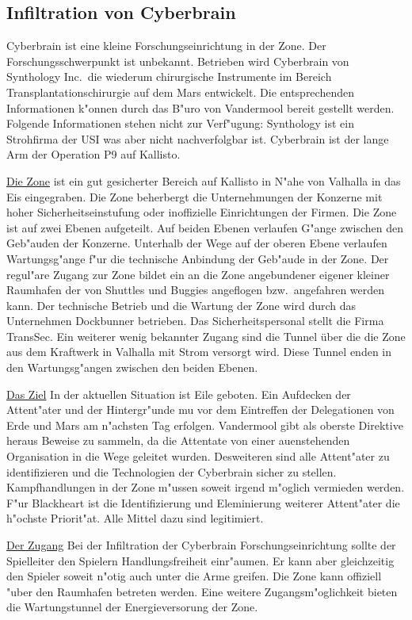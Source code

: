 \newcommand{\ml}{\pinyin{Mailin2}}
\subsection{Infiltration von Cyberbrain}

Cyberbrain ist eine kleine Forschungseinrichtung in der Zone. Der Forschungsschwerpunkt ist unbekannt. Betrieben wird Cyberbrain von Synthology Inc.~die wiederum chirurgische Instrumente im Bereich Transplantationschirurgie auf dem Mars entwickelt. Die entsprechenden Informationen k"onnen durch das B"uro von Vandermool bereit gestellt werden. Folgende Informationen stehen nicht zur Verf"ugung: Synthology ist ein Strohfirma der USI was aber nicht nachverfolgbar ist. Cyberbrain ist der lange Arm der Operation P9 auf Kallisto.

\underline{Die Zone} ist ein gut gesicherter Bereich auf Kallisto in N"ahe von Valhalla in das Eis eingegraben. Die Zone beherbergt die Unternehmungen der Konzerne mit hoher Sicherheitseinstufung oder inoffizielle Einrichtungen der Firmen. Die Zone ist auf zwei Ebenen aufgeteilt. Auf beiden Ebenen verlaufen G"ange zwischen den Geb"auden der Konzerne. Unterhalb der Wege auf der oberen Ebene verlaufen Wartungsg"ange f"ur die technische Anbindung der Geb"aude in der Zone. Der regul"are Zugang zur Zone bildet ein an die Zone angebundener eigener kleiner Raumhafen der von Shuttles und Buggies angeflogen bzw.~angefahren werden kann. Der technische Betrieb und die Wartung der Zone wird durch das Unternehmen Dockbunner betrieben. Das Sicherheitspersonal stellt die Firma TransSec. Ein weiterer wenig bekannter Zugang sind die Tunnel über die die Zone aus dem Kraftwerk in Valhalla mit Strom versorgt wird. Diese Tunnel enden in den Wartungsg"angen zwischen den beiden Ebenen.

\underline{Das Ziel} In der aktuellen Situation ist Eile geboten. Ein Aufdecken der Attent"ater und der Hintergr"unde mu\3 vor dem Eintreffen der Delegationen von Erde und Mars am n"achsten Tag erfolgen. Vandermool gibt als oberste Direktive heraus Beweise zu sammeln, da\3 die Attentate von einer au\3enstehenden Organisation in die Wege geleitet wurden. Desweiteren sind alle Attent"ater zu identifizieren und die Technologien der Cyberbrain sicher zu stellen. Kampfhandlungen in der Zone m"ussen soweit irgend m"oglich vermieden werden. F"ur Blackheart ist die Identifizierung und Eleminierung weiterer Attent"ater die h"ochste Priorit"at. Alle Mittel dazu sind legitimiert. 

\underline{Der Zugang} Bei der Infiltration der Cyberbrain Forschungseinrichtung sollte der Spielleiter den Spielern Handlungsfreiheit einr"aumen. Er kann aber gleichzeitig den Spieler soweit n"otig auch unter die Arme greifen. Die Zone kann offiziell "uber den Raumhafen betreten werden. Eine weitere Zugangsm"oglichkeit bieten die Wartungstunnel der Energieversorung der Zone.

